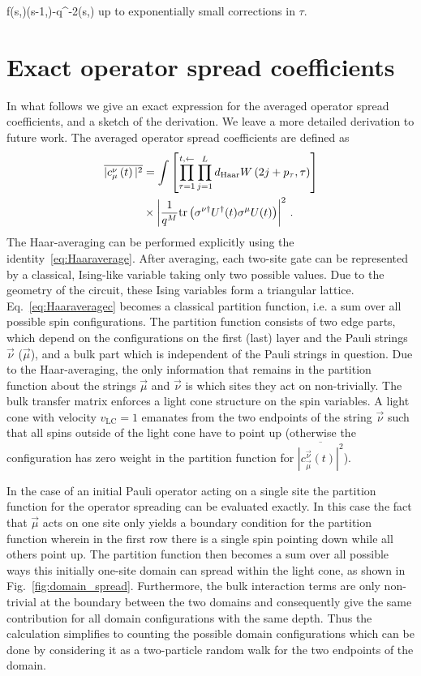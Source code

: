 \documentclass[aps,prb,twocolumn,superscriptaddress]{revtex4-1}
\begin{document}
\be
f(s,\tau)\approx{}(s-1,\tau)-q^{-2}\left(s,\tau\right)
\ee
up to exponentially small corrections in $\tau$.

 
\section{Exact operator spread coefficients}\label{App:cmunu}
In what follows we give an exact expression for the averaged operator spread coefficients, and a sketch of the derivation. We leave a more detailed derivation to future work. The averaged operator spread coefficients are defined as
\begin{align}
\overline{|c_{\mathbf{\mu}}^{\mathbf{\nu}}\left(t\right)|^{2}} & =\int\left[\prod_{\tau=1}^{t,\leftarrow}\prod_{j=1}^{L}d_{\text{Haar}}W\left(2j+p_{\tau},\tau\right)\right]\nonumber \\
 & \times\left|\frac{1}{q^{M}}\text{tr}\left(\sigma^{\mathbf{\nu}\dagger}U^{\dagger}(t)\sigma^{\mathbf{\mu}}U(t)\right)\right|^{2}\label{eq:Haaraveragec}\,.
\end{align}
The Haar-averaging can be performed explicitly using the identity~\eqref{eq:Haaraverage}. After averaging, each two-site gate can be represented by a classical, Ising-like variable taking only two possible values. Due to the geometry of the circuit, these Ising variables form a triangular lattice. Eq.~\eqref{eq:Haaraveragec} becomes a classical partition function, i.e. a sum over all possible spin configurations. The partition function consists of two edge parts, which depend on the configurations on the first (last) layer and the Pauli strings $\vec{\nu}$ ($\vec{\mu}$), and a bulk part which is independent of the Pauli strings in question. Due to the Haar-averaging, the only information that remains in the partition function about the strings $\vec{\mu}$ and $\vec{\nu}$ is which sites they act on non-trivially. The bulk transfer matrix enforces a light cone structure on the spin variables. A light cone with velocity $v_\text{LC} = 1$ emanates from the two endpoints of the string $\vec{\nu}$ such that all spins outside of the light cone have to point up (otherwise the configuration has zero weight in the partition function for $\overline{|c_{\vec{\mu}}^{\vec{\nu}}(t)|^{2}}$).

In the case of an initial Pauli operator acting on a single site the partition function for the operator spreading can be evaluated exactly. In this case the fact that $\vec{\mu}$ acts on one site only yields a boundary condition for the partition function wherein in the first row there is a single spin pointing down while all others point up. The partition function then becomes a sum over all possible ways this initially one-site domain can spread within the light cone, as shown in Fig.~\ref{fig:domain_spread}. Furthermore, the bulk interaction terms are only non-trivial at the boundary between the two domains and consequently give the same contribution for all domain configurations with the same depth. Thus the calculation simplifies to counting the possible domain configurations which can be done by considering it as a two-particle random walk for the two endpoints of the domain.
\end{document}
